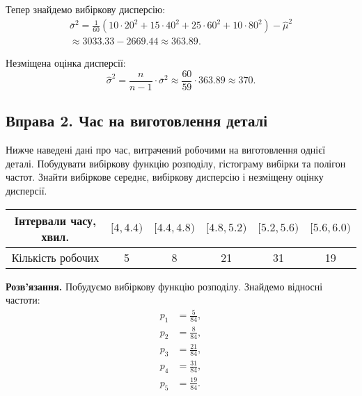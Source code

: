 \documentclass{hw_template}
\begin{document}
Тепер знайдемо вибіркову дисперсію:
\begin{align*}
    \overline{\sigma}^2 = \frac{1}{60} \left(10 \cdot 20^2 + 15 \cdot 40^2 + 25 \cdot 60^2 + 10 \cdot 80^2\right) - \hat{\mu}^2 \\
    \approx 3033.33 - 2669.44 \approx 363.89.
\end{align*}

Незміщена оцінка дисперсії:
\begin{equation*}
    \hat{\sigma}^2 = \frac{n}{n-1} \cdot \overline{\sigma}^2 \approx \frac{60}{59} \cdot 363.89 \approx 370.
\end{equation*}

\subsection{Вправа 2. Час на виготовлення деталі}

\begin{problem}
    Нижче наведені дані про час, витрачений робочими на виготовлення однієї
    деталі. Побудувати вибіркову функцію розподілу, гістограму вибірки та
    полігон частот. Знайти вибіркове середнє, вибіркову дисперсію і незміщену
    оцінку дисперсії.

    \begin{center}
        \begin{tabular}{|c|c|c|c|c|c|}
            \hline
            Інтервали часу, хвил. & $[4,4.4)$ & $[4.4,4.8)$ & $[4.8,5.2)$ & $[5.2,5.6)$ & $[5.6,6.0)$ \\
            \hline
            Кількість робочих & 5 & 8 & 21 & 31 & 19 \\
            \hline
        \end{tabular}
    \end{center}
\end{problem}

\textbf{Розв'язання.} Побудуємо вибіркову функцію розподілу. Знайдемо відносні частоти:
\begin{equation*}
    \begin{aligned}
        p_1 &= \frac{5}{84}, \\
        p_2 &= \frac{8}{84}, \\
        p_3 &= \frac{21}{84}, \\
        p_4 &= \frac{31}{84}, \\
        p_5 &= \frac{19}{84}.
    \end{aligned}
\end{equation*}
\end{document}
